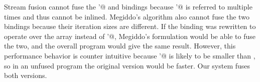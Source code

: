 Stream fusion cannot fuse the \Hs@pts'@ and \Hs@ma@ bindings because \Hs@pts'@ is referred to multiple times and thus cannot be inlined.
Megiddo's algorithm also cannot fuse the two bindings because their iteration sizes are different.
If the \Hs@ma@ binding was rewritten to operate over the \Hs@pts@ array instead of \Hs@pts'@, Megiddo's formulation would be able to fuse the two, and the overall program would give the same result.
However, this performance behavior is counter intuitive because \Hs@pts'@ is likely to be smaller than \Hs@pts@, so in an unfused program the original version would be faster.
Our system fuses both versions.

